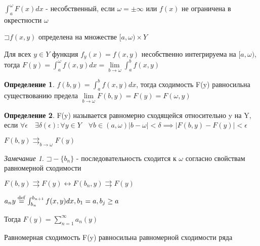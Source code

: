 \documentclass[a4paper]{article}
\newcommand\letsymbol{\mathord{\sqsupset}}
\theoremstyle{definition}
\newtheorem*{definition}{Определение}
\theoremstyle{remark}
\newtheorem*{remark}{Замечание}
\begin{document}
    $\int_a^\omega F(x)dx$ - несобственный, если $\omega = \pm\infty$ или $f(x)$ не ограничена в окрестности $\omega$

$\letsymbol{} f(x,y)$ определена на множестве $[a, \omega)\times Y$

Для всех $y\in Y$ функция $f_y(x) = f(x,y)$ несобственно интегрируема на $[a, \omega)$, тогда $F(y) = \int_a^\omega f(x,y)dx = \lim\limits_{b\to\omega} \int_a^b f(x,y)$

\begin{definition}
     $f(b, y) = \int_a^b f(x,y) dx$, тогда сходимость F(y) равносильна существованию предела $\lim\limits_{b\to\omega}F(b, y) = F(y) = F(\omega, y)$
\end{definition}
\begin{definition}
     F(y) называется равномерно сходящейся относительно y на Y, если $\forall\epsilon \quad\exists\delta(\epsilon): \forall y\in Y \quad \forall b \in (a,\omega) |b-\omega|< \delta \implies |F(b, y) - F(y)| < \epsilon$

     $F(b, y)\rightrightarrows_{b\to \omega} F(y)$
\end{definition}
\begin{remark}
     $\letsymbol{} - \{b_n\}$ - последовательность сходится к $\omega$ согласно свойствам равномерной сходимости

     $F(b,y) \rightrightarrows F(y) \leftrightarrow F(b_n, y) \rightrightarrows F(y)$

     $a_n y \stackrel{\rm{def}}{=} \int_{b_n}^{b_{n+1}}f(x,y)dx, b_1 = a, b_j \geq a$

     Тогда $F(y) = \sum_{n = 1}^{\infty} a_n(y) $

     Равномерная сходимость F(y) равносильна равномерной сходимости ряда
\end{remark}
\end{document}
